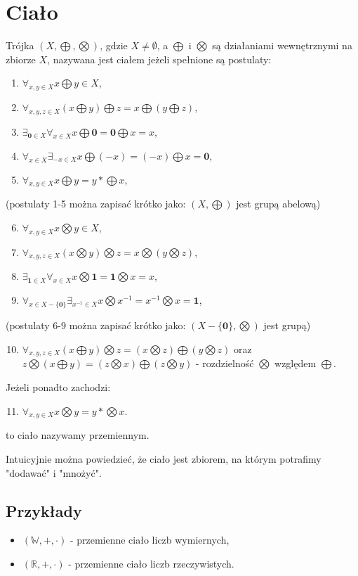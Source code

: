 \documentclass{article}
\begin{document}
\section{Ciało}
Trójka $(X, \bigoplus, \bigotimes)$, gdzie $X \neq \emptyset$, a $\bigoplus$ i $\bigotimes$ są działaniami wewnętrznymi na zbiorze $X$, nazywana jest ciałem jeżeli spełnione są postulaty:
\begin{enumerate}
    \item $\forall_{x,y \in X} x \bigoplus y \in X$,
    \item $\forall_{x, y, z \in X} (x \bigoplus y) \bigoplus z = x \bigoplus (y \bigoplus z)$,
    \item $\exists_{\textbf{0} \in X} \forall_{x \in X} x \bigoplus \textbf{0} = \textbf{0} \bigoplus x = x$,
    \item $\forall_{x \in X} \exists_{-x \in X} x \bigoplus (-x) = (-x) \bigoplus x = \textbf{0}$,
    \item $\forall_{x,y \in X} x \bigoplus y = y *\bigoplus x$,
\end{enumerate}
(postulaty 1-5 można zapisać krótko jako: $(X, \bigoplus)$ jest grupą abelową)
\begin{enumerate}
    \setcounter{enumi}{5}
    \item $\forall_{x,y \in X} x \bigotimes y \in X$,
    \item $\forall_{x, y, z \in X} (x \bigotimes y) \bigotimes z = x \bigotimes (y \bigotimes z)$,
    \item $\exists_{\textbf{1} \in X} \forall_{x \in X} x \bigotimes \textbf{1} = \textbf{1} \bigotimes x = x$,
    \item $\forall_{x \in X-\{\textbf{0}\}} \exists_{x^{-1} \in X} x \bigotimes x^{-1} = x^{-1} \bigotimes x = \textbf{1}$,
\end{enumerate}
(postulaty 6-9 można zapisać krótko jako: $(X - \{\textbf{0}\}, \bigotimes)$ jest grupą)
\begin{enumerate}
    \setcounter{enumi}{9}
    \item $\forall_{x,y,z \in X} (x \bigoplus y) \bigotimes z = (x \bigotimes z) \bigoplus (y \bigotimes z)$ oraz $z \bigotimes (x \bigoplus y) = (z \bigotimes x) \bigoplus (z \bigotimes y)$ - rozdzielność $\bigotimes$ względem $\bigoplus$.
\end{enumerate}
Jeżeli ponadto zachodzi:
\begin{enumerate}
    \setcounter{enumi}{10}
    \item $\forall_{x,y \in X} x \bigotimes y = y *\bigotimes x$.
\end{enumerate}
to ciało nazywamy przemiennym.

Intuicyjnie można powiedzieć, że ciało jest zbiorem, na którym potrafimy "dodawać" i "mnożyć".

\subsection{Przykłady}
\begin{itemize}
    \item $(\mathbb{W}, +, \cdot)$ - przemienne ciało liczb wymiernych,
    \item $(\mathbb{R}, +, \cdot)$ - przemienne ciało liczb rzeczywistych.
\end{itemize}
\end{document}
